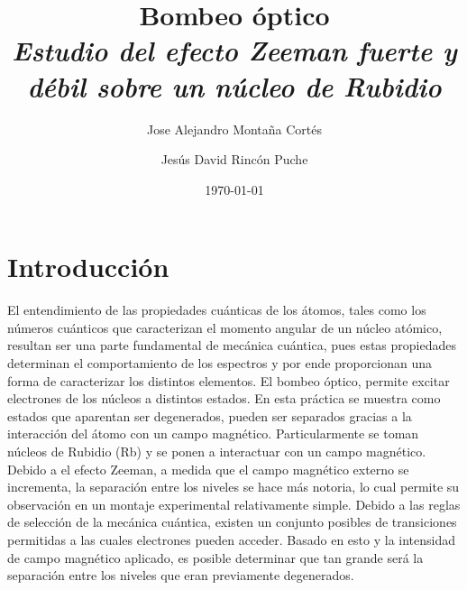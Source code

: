\documentclass[%
 reprint,
 amsmath,amssymb,
 aps,
]{revtex4-1}
\newcommand{\subtitle}[1]{%
\posttitle{%
    \par\end{center}
\begin{center}\large#1\end{center}
\vskip0.5em}%
}
\begin{document}

\title{Bombeo óptico\\ \textit{Estudio del efecto Zeeman fuerte y débil sobre un núcleo de Rubidio } }%


\author{Jose Alejandro Montaña Cortés}
\author{Jesús David Rincón Puche}%
%


\date{\today}%

\begin{abstract}



\end{abstract}
\maketitle

\section{Introducción}
 El entendimiento de las propiedades cuánticas de los átomos, tales como los números cuánticos que caracterizan el momento angular de un núcleo atómico, resultan ser una parte fundamental de mecánica cuántica, pues estas propiedades determinan el comportamiento de los espectros y por ende proporcionan una forma de caracterizar los distintos elementos. El bombeo óptico, permite excitar electrones de los núcleos a distintos estados. En esta práctica se muestra como estados que aparentan ser degenerados, pueden ser separados gracias a la interacción del átomo con un campo magnético. Particularmente se toman núcleos de Rubidio (Rb) y se ponen a interactuar con un campo magnético. Debido a el efecto Zeeman, a medida que el campo magnético externo se incrementa, la separación entre los niveles se hace más notoria, lo cual permite su observación en un montaje experimental relativamente simple.
 Debido a las reglas de selección de la mecánica cuántica, existen un conjunto posibles de transiciones permitidas a las cuales electrones pueden acceder. Basado en esto y la intensidad de campo magnético aplicado, es posible determinar que tan grande será la separación entre los niveles que eran previamente degenerados.
\end{document}
